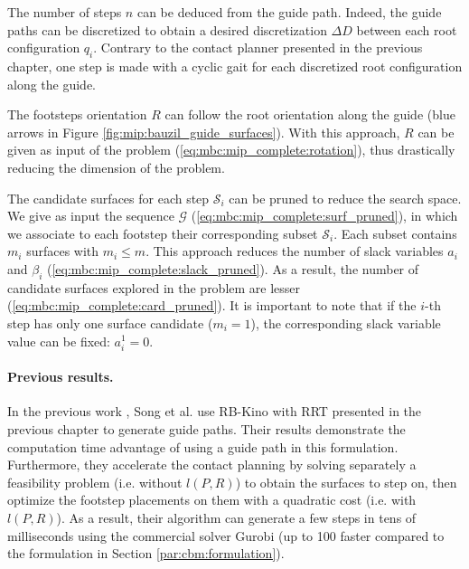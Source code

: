 The number of steps $n$ can be deduced from the guide path.
Indeed, the guide paths can be discretized to obtain a desired discretization $\Delta D$ between each root configuration $q_i$.
Contrary to the contact planner presented in the previous chapter, one step is made with a cyclic gait for each discretized root configuration along the guide.

The footsteps orientation $R$ can follow the root orientation along the guide (blue arrows in Figure \ref{fig:mip:bauzil_guide_surfaces}).
With this approach, $R$ can be given as input of the problem (\ref{eq:mbc:mip_complete:rotation}), thus drastically reducing the dimension of the problem.

The candidate surfaces for each step $\mathcal{S}_i$ can be pruned to reduce the search space.
We give as input the sequence $\mathcal{G}$ (\ref{eq:mbc:mip_complete:surf_pruned}), in which we associate to each footstep their corresponding subset $\mathcal{S}_i$. Each subset contains $m_i$ surfaces with $m_i \leq m$. 
This approach reduces the number of slack variables $a_i$ and $\beta_i$ (\ref{eq:mbc:mip_complete:slack_pruned}).
As a result, the number of candidate surfaces explored in the problem are lesser (\ref{eq:mbc:mip_complete:card_pruned}).
It is important to note that if the $i$-th step has only one surface candidate ($m_i=1$), the corresponding slack variable value can be fixed: $a_i^1 = 0$.

\paragraph{Previous results.}
In the previous work \cite{sl1m_v2}, Song et al. use RB-Kino with RRT \cite{kinodynamic_sm_2017} presented in the previous chapter to generate guide paths.
Their results demonstrate the computation time advantage of using a guide path in this formulation. 
Furthermore, they accelerate the contact planning by solving separately a feasibility problem (i.e. without $l(P,R)$) to obtain the surfaces to step on, then optimize the footstep placements on them with a quadratic cost (i.e. with $l(P,R)$).
As a result, their algorithm can generate a few steps in tens of milliseconds using the commercial solver Gurobi \cite{gurobi} (up to 100 faster compared to the formulation in Section \ref{par:cbm:formulation}).

